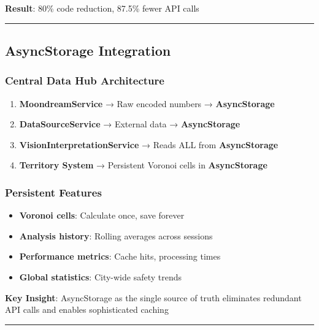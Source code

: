 \documentclass[
  letterpaper,
  DIV=11,
  numbers=noendperiod]{scrartcl}
\providecommand{\tightlist}{%
  \setlength{\itemsep}{0pt}\setlength{\parskip}{0pt}}
\begin{document}
\textbf{Result}: 80\% code reduction, 87.5\% fewer API calls

\begin{center}\rule{0.5\linewidth}{0.5pt}\end{center}

\subsection{AsyncStorage Integration}\label{asyncstorage-integration}

\subsubsection{Central Data Hub
Architecture}\label{central-data-hub-architecture}

\begin{enumerate}
\def\labelenumi{\arabic{enumi}.}
\tightlist
\item
  \textbf{MoondreamService} → Raw encoded numbers →
  \textbf{AsyncStorage}
\item
  \textbf{DataSourceService} → External data → \textbf{AsyncStorage}\\
\item
  \textbf{VisionInterpretationService} → Reads ALL from
  \textbf{AsyncStorage}
\item
  \textbf{Territory System} → Persistent Voronoi cells in
  \textbf{AsyncStorage}
\end{enumerate}

\subsubsection{Persistent Features}\label{persistent-features}

\begin{itemize}
\tightlist
\item
  \textbf{Voronoi cells}: Calculate once, save forever
\item
  \textbf{Analysis history}: Rolling averages across sessions
\item
  \textbf{Performance metrics}: Cache hits, processing times
\item
  \textbf{Global statistics}: City-wide safety trends
\end{itemize}

\textbf{Key Insight}: AsyncStorage as the single source of truth
eliminates redundant API calls and enables sophisticated caching

\begin{center}\rule{0.5\linewidth}{0.5pt}\end{center}
\end{document}
